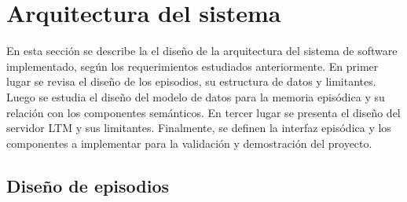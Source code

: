 


\section{Arquitectura del sistema}
 
En esta sección se describe la el diseño de la arquitectura del sistema de software implementado, según los requerimientos estudiados anteriormente. En primer lugar se revisa el diseño de los episodios, su estructura de datos y limitantes. Luego se estudia el diseño del modelo de datos para la memoria episódica y su relación con los componentes semánticos. En tercer lugar se presenta el diseño del servidor LTM y sus limitantes. Finalmente, se definen la interfaz episódica y los componentes a implementar para la validación y demostración del proyecto.
 
 
\subsection{Diseño de episodios}

